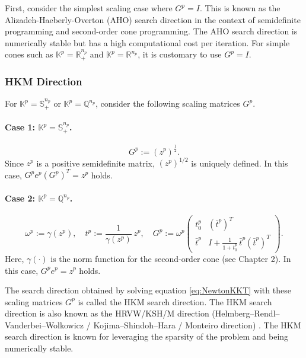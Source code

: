 \documentclass{scrartcl}
\begin{document}
First, consider the simplest scaling case where $G^p = I$. This is known as the Alizadeh-Haeberly-Overton (AHO) search direction \cite{Alizadeh1998} in the context of semidefinite programming and second-order cone programming. The AHO search direction is numerically stable but has a high computational cost per iteration. For simple cones such as $\mathbb{K}^p = \mathbb{R}^{n_p}_+$ and $\mathbb{K}^p = \mathbb{R}^{n_p}$, it is customary to use $G^p = I$.

\medskip

\subsubsection{HKM Direction}

\noindent

For $\mathbb{K}^p = \mathbb{S}^{n_p}_+$ or $\mathbb{K}^p = \mathbb{Q}^{n_p}$, consider the following scaling matrices $G^p$.

\paragraph{Case 1: \(\mathbb{K}^p = \mathbb{S}^{n_p}_+\).}
\[
  G^p := (z^p)^{\tfrac12}.
\]
Since $z^p$ is a positive semidefinite matrix, $(z^p)^{1/2}$ is uniquely defined. In this case, $G^p e^p (G^p)^T = z^p$ holds.

\paragraph{Case 2: \(\mathbb{K}^p = \mathbb{Q}^{n_p}\).}
\[
  \omega^p := \gamma(z^p), 
  \quad
  t^p := \frac{1}{\gamma(z^p)}\, z^p,
  \quad
  G^p :=
  \omega^p
  \begin{pmatrix}
    t^p_0 & (\bar{t}^p)^T \\
    \bar{t}^p & I + \frac{1}{1+t^p_0}\,\bar{t}^p(\bar{t}^p)^T
  \end{pmatrix}.
\]
Here, $\gamma(\cdot)$ is the norm function for the second-order cone (see Chapter 2). In this case, $G^p e^p = z^p$ holds.

\medskip

The search direction obtained by solving equation \eqref{eq:NewtonKKT} with these scaling matrices $G^p$ is called the HKM search direction. The HKM search direction is also known as the HRVW/KSH/M direction (Helmberg--Rendl--Vanderbei--Wolkowicz / Kojima--Shindoh--Hara / Monteiro direction) \cite{Kojima1997,Monteiro1997}. The HKM search direction is known for leveraging the sparsity of the problem and being numerically stable.
\end{document}
